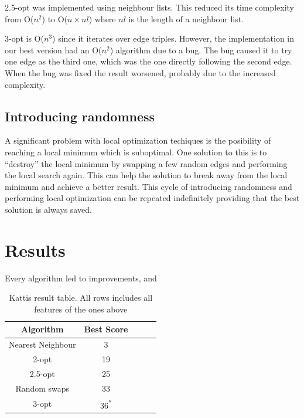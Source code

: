 \documentclass[paper=a4, fontsize=11pt,numbers=endperiod]{scrartcl} %
\numberwithin{equation}{section} %
\numberwithin{figure}{section} %
\numberwithin{table}{section} %
\begin{document}
2.5-opt was implemented using neighbour lists.
This reduced its time complexity from O($n^2$) to O($n\times nl$) where $nl$ is the length of a neighbour list.

3-opt is O($n^3$) since it iterates over edge triples.
However, the implementation in our best version had an O($n^2$) algorithm due to a bug.
The bug caused it to try one edge as the third one, which was the one directly following the second edge.
When the bug was fixed the result worsened, probably due to the increased complexity.

\subsection{Introducing randomness}
A significant problem with local optimization techiques is the posibility of reaching a local minimum which is suboptimal.
One solution to this is to ``destroy'' the local minimum by swapping a few random edges and performing the local search again.
This can help the solution to break away from the local minimum and achieve a better result.
This cycle of introducing randomness and performing local optimization can be repeated indefinitely providing that the best solution is always saved.


\section{Results}

Every algorithm led to improvements, and 

\begin{table}[h]
  \centering
    \begin{tabular}{|c|c|c|c|c|}
    \hline
    \textbf{Algorithm} & \textbf{Best Score} \\ \hline
    Nearest Neighbour & 3 \\ \hline
    2-opt & 19 \\ \hline
    2.5-opt & 25 \\ \hline
    Random swaps & 33 \\ \hline
    3-opt & 36\textsuperscript{*} \\ \hline
    \end{tabular}
    \caption{Kattis result table. All rows includes all features of the ones above}
    \hspace{10pt}
  \end{table}
\end{document}
